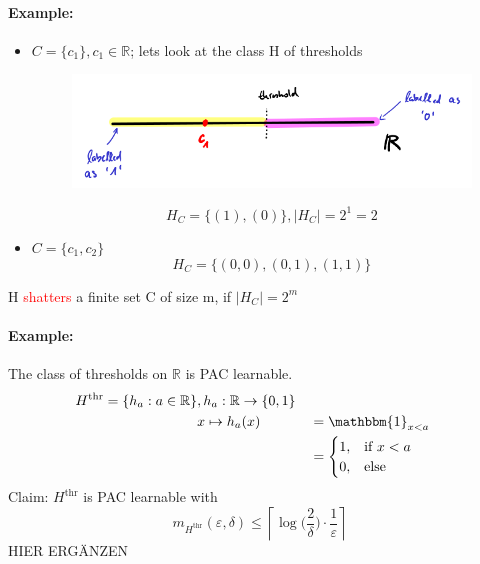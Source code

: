 \documentclass[10pt,a4paper]{article}
\theoremstyle{definition}
\theoremstyle{plain}
\begin{document}
\paragraph{Example:}
\begin{itemize}
	\item $C = \{c_1\}, c_1 \in \mathbb{R}$; lets look at the class H of thresholds
	\begin{figure}[H]
		\centering
		\includegraphics[width=0.9\linewidth]{sketch_3}
		\label{fig:sketch3}
	\end{figure}
	$$ H_C = \{(1), (0)\}, |H_C| = 2^1 = 2$$
	\item $C = \{c_1, c_2\}$
		$$ H_C = \{(0,0), (0,1), (1,1)\} $$
\end{itemize}

\begin{boxedsubdef}
	H \textcolor{red}{shatters} a finite set C of size m, if $|H_C| = 2^m$
\end{boxedsubdef}

\paragraph{Example:}
The class of thresholds on $\mathbb{R}$ is PAC learnable.
\begin{align*}
	H^{\text{thr}} = \{h_a: a \in \mathbb{R}\}&, h_a: \mathbb{R}\to\{0,1\}\\
	&x \mapsto h_a(x) &&= \mathbbm{1}_{x<a}\\
	& &&= \begin{cases}
		1 , &  \text{if } x<a \\
		0 , &  \text{else} 
	\end{cases}
\end{align*}
Claim: $H^{\text{thr}}$ is PAC learnable with
$$
	m_{H^{\text{thr}}}(\varepsilon, \delta) \leq \left\lceil \log \bigg(\frac{2}{\delta}\bigg) \cdot \frac{1}{\varepsilon}\right\rceil
$$
HIER ERGÄNZEN
\end{document}
